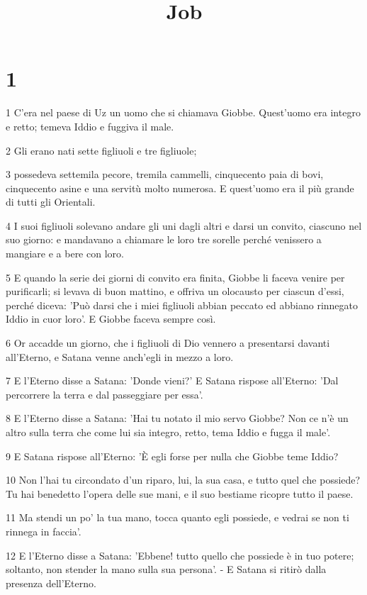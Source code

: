 

\title{Job}


\chapter{1}

\par 1 C'era nel paese di Uz un uomo che si chiamava Giobbe. Quest'uomo era integro e retto; temeva Iddio e fuggiva il male.
\par 2 Gli erano nati sette figliuoli e tre figliuole;
\par 3 possedeva settemila pecore, tremila cammelli, cinquecento paia di bovi, cinquecento asine e una servitù molto numerosa. E quest'uomo era il più grande di tutti gli Orientali.
\par 4 I suoi figliuoli solevano andare gli uni dagli altri e darsi un convito, ciascuno nel suo giorno: e mandavano a chiamare le loro tre sorelle perché venissero a mangiare e a bere con loro.
\par 5 E quando la serie dei giorni di convito era finita, Giobbe li faceva venire per purificarli; si levava di buon mattino, e offriva un olocausto per ciascun d'essi, perché diceva: 'Può darsi che i miei figliuoli abbian peccato ed abbiano rinnegato Iddio in cuor loro'. E Giobbe faceva sempre così.
\par 6 Or accadde un giorno, che i figliuoli di Dio vennero a presentarsi davanti all'Eterno, e Satana venne anch'egli in mezzo a loro.
\par 7 E l'Eterno disse a Satana: 'Donde vieni?' E Satana rispose all'Eterno: 'Dal percorrere la terra e dal passeggiare per essa'.
\par 8 E l'Eterno disse a Satana: 'Hai tu notato il mio servo Giobbe? Non ce n'è un altro sulla terra che come lui sia integro, retto, tema Iddio e fugga il male'.
\par 9 E Satana rispose all'Eterno: 'È egli forse per nulla che Giobbe teme Iddio?
\par 10 Non l'hai tu circondato d'un riparo, lui, la sua casa, e tutto quel che possiede? Tu hai benedetto l'opera delle sue mani, e il suo bestiame ricopre tutto il paese.
\par 11 Ma stendi un po' la tua mano, tocca quanto egli possiede, e vedrai se non ti rinnega in faccia'.
\par 12 E l'Eterno disse a Satana: 'Ebbene! tutto quello che possiede è in tuo potere; soltanto, non stender la mano sulla sua persona'. - E Satana si ritirò dalla presenza dell'Eterno.
